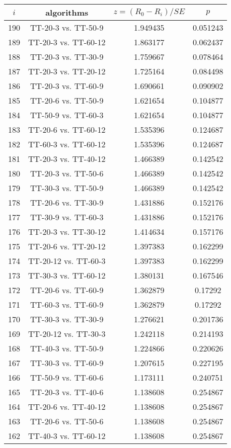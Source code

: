 \documentclass[a4paper,10pt]{article}
\begin{document}
\begin{landscape}
\begin{table}[!htp]
\centering\scriptsize
\begin{tabular}{cccc}
$i$&algorithms&$z=(R_0 - R_i)/SE$&$p$\\
\hline190&TT-20-3 vs. TT-50-9&1.949435&0.051243\\
189&TT-20-3 vs. TT-60-12&1.863177&0.062437\\
188&TT-20-3 vs. TT-30-9&1.759667&0.078464\\
187&TT-20-3 vs. TT-20-12&1.725164&0.084498\\
186&TT-20-3 vs. TT-60-9&1.690661&0.090902\\
185&TT-20-6 vs. TT-50-9&1.621654&0.104877\\
184&TT-50-9 vs. TT-60-3&1.621654&0.104877\\
183&TT-20-6 vs. TT-60-12&1.535396&0.124687\\
182&TT-60-3 vs. TT-60-12&1.535396&0.124687\\
181&TT-20-3 vs. TT-40-12&1.466389&0.142542\\
180&TT-20-3 vs. TT-50-6&1.466389&0.142542\\
179&TT-30-3 vs. TT-50-9&1.466389&0.142542\\
178&TT-20-6 vs. TT-30-9&1.431886&0.152176\\
177&TT-30-9 vs. TT-60-3&1.431886&0.152176\\
176&TT-20-3 vs. TT-30-12&1.414634&0.157176\\
175&TT-20-6 vs. TT-20-12&1.397383&0.162299\\
174&TT-20-12 vs. TT-60-3&1.397383&0.162299\\
173&TT-30-3 vs. TT-60-12&1.380131&0.167546\\
172&TT-20-6 vs. TT-60-9&1.362879&0.17292\\
171&TT-60-3 vs. TT-60-9&1.362879&0.17292\\
170&TT-30-3 vs. TT-30-9&1.276621&0.201736\\
169&TT-20-12 vs. TT-30-3&1.242118&0.214193\\
168&TT-40-3 vs. TT-50-9&1.224866&0.220626\\
167&TT-30-3 vs. TT-60-9&1.207615&0.227195\\
166&TT-50-9 vs. TT-60-6&1.173111&0.240751\\
165&TT-20-3 vs. TT-40-6&1.138608&0.254867\\
164&TT-20-6 vs. TT-40-12&1.138608&0.254867\\
163&TT-20-6 vs. TT-50-6&1.138608&0.254867\\
162&TT-40-3 vs. TT-60-12&1.138608&0.254867\\

\end{tabular}
\end{table}
\end{landscape}
\end{document}

